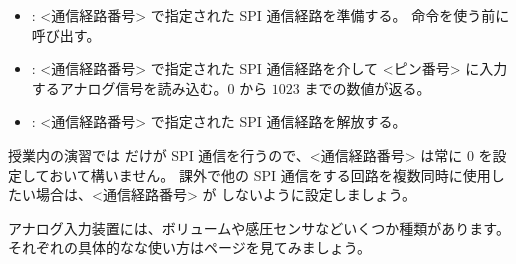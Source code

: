 \begin{itemize}
\item {}: <通信経路番号> で指定された SPI 通信経路を準備する。\code{\adcget} 命令を使う前に呼び出す。
\item {}: <通信経路番号> で指定された SPI 通信経路を介して <ピン番号> に入力するアナログ信号を読み込む。$0$ から $1023$ までの数値が返る。
\item {}: <通信経路番号> で指定された SPI 通信経路を解放する。
\end{itemize}

授業内の演習では \ADC だけが SPI 通信を行うので、<通信経路番号> は常に 0 を設定しておいて構いません。
課外で他の SPI 通信をする回路を複数同時に使用したい場合は、<通信経路番号> が しないように設定しましょう。

アナログ入力装置には、ボリュームや感圧センサなどいくつか種類があります。それぞれの具体的なな使い方は\pageref{analog_in}ページを見てみましょう。\\

\begin{tcolorbox}[title=\useOmetoi]
\begin{enumerate}
\end{enumerate}
\end{tcolorbox}
